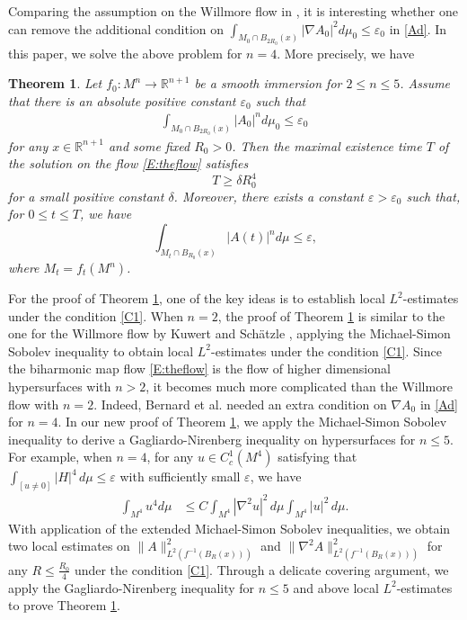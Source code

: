 \documentclass{amsart}
\newtheorem{theorem}{Theorem}[section]
\theoremstyle{definition}
\numberwithin{equation}{section}
\begin{document}
Comparing  the  assumption on the Willmore flow in \cite{KS1},  it is interesting whether one can remove  the additional condition on
$\int_{M_0\cap B_{2R_0}\left( x \right) } |\nabla A_0|^2
d\mu_{0} \leq \varepsilon_0 $ in \eqref{Ad}. In this paper,  we   solve the above problem   for $n=4$. More precisely, we have


\begin{theorem} \label{T1}
Let $f_0: M^n \rightarrow \mathbb{R}^{n+1}$ be a smooth  immersion for  $2\leq n\leq 5$.
Assume that  there is an absolute positive constant $\varepsilon_0 $ such
that
 \begin{align} \label{C1}
\int_{ M_0\cap B_{2R_0}(x)  } \left| A_{0} \right|^{n} d\mu_{0} \leq \varepsilon_{0}
 \end{align}
for any $x\in \mathbb{R}^{n+1}$ and some fixed  $R_0>0$.  Then the maximal
existence time $T$ of the solution on the flow \eqref{E:theflow} satisfies
$$T \geq  \delta R_0^4$$ for a small positive constant $\delta$.
Moreover, there exists a constant $\varepsilon> \varepsilon_0$ such that, for $0 \leq t \leq T$, we have
$$\int_{M_t\cap B_{R_0} (x)} \left| A(t) \right|^{n} d\mu \leq  \varepsilon\mbox{,}$$
where $M_t=f_t(M^n)$.
\end{theorem}

For the proof of Theorem    \ref{T1}, one of the key ideas is to  establish   local $L^2$-estimates under the condition \eqref{C1}.
When $n=2$, the proof  of  Theorem    \ref{T1} is  similar to the one for the
Willmore flow by  Kuwert and Sch\"atzle \cite{KS1},  applying the Michael-Simon Sobolev inequality to obtain local $L^2$-estimates under the condition \eqref{C1}.
Since the biharmonic map flow \eqref{E:theflow} is the flow  of higher dimensional hypersurfaces with $n>2$,   it becomes much more complicated
than the
Willmore
flow with $n=2$. Indeed, Bernard  et al.  \cite{BWW} needed an extra condition on $\nabla A_0$ in \eqref{Ad} for $n=4$.
 In our new proof of Theorem    \ref{T1}, we    apply  the Michael-Simon Sobolev inequality to derive a
Gagliardo-Nirenberg inequality  on hypersurfaces for $n\leq 5$.  For example, when $n=4$, for any $u\in
C^{1}_{c}\left( M^4 \right)$ satisfying that $\int_{[u\neq 0]}|H|^4\,d\mu\leq \varepsilon$ with sufficiently small $\varepsilon$, we have
\begin{align*}
 \int_{M^4} u^{4} d\mu
&\leq C  \int_{M^4} |\nabla^2 u|^2 \,d\mu   \int_{M^4} |  u|^2  \,d\mu.
\end{align*}
 With application of the extended  Michael-Simon Sobolev inequalities, we  obtain two local estimates on
$\|A\|^2_{L^2\left (f^{-1}\left(B_{R} (x) \right)\right)}$  and
$\|\nabla^2A\|_{L^2\left (f^{-1} (B_{R} (x))\right)}^2$ for any $R\leq \frac {R_0}4$ under the condition \eqref{C1}. Through a delicate
covering argument, we apply the
Gagliardo-Nirenberg inequality for $n\leq 5$ and   above local $L^2$-estimates to prove Theorem  \ref{T1}.
\medskip
\end{document}
